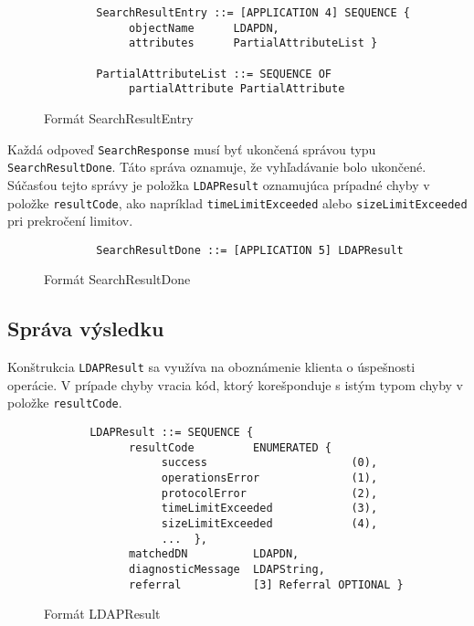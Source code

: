 \documentclass[11pt,a4paper]{article}
\begin{document}
\begin{figure}[H]
\begin{verbatim}
        SearchResultEntry ::= [APPLICATION 4] SEQUENCE {
             objectName      LDAPDN,
             attributes      PartialAttributeList }
             
        PartialAttributeList ::= SEQUENCE OF
             partialAttribute PartialAttribute
\end{verbatim}
\caption{Formát SearchResultEntry}
\end{figure}

\noindent Každá odpoveď \texttt{SearchResponse} musí byť ukončená správou typu \texttt{SearchResultDone}. Táto správa oznamuje, že vyhľadávanie bolo ukončené. Súčasťou tejto správy je položka \texttt{LDAPResult} oznamujúca prípadné chyby v položke \texttt{resultCode}, ako napríklad \texttt{timeLimitExceeded} alebo \texttt{sizeLimitExceeded} pri prekročení limitov. \\

\begin{figure}[H]
\begin{verbatim}
        SearchResultDone ::= [APPLICATION 5] LDAPResult
\end{verbatim}
\caption{Formát SearchResultDone}
\end{figure}

\subsection{Správa výsledku}
Konštrukcia \texttt{LDAPResult} sa využíva na oboznámenie klienta o úspešnosti operácie. V prípade chyby vracia kód, ktorý korešponduje s istým typom chyby v položke \texttt{resultCode}.\\

\begin{figure}[H]
\begin{verbatim}
       LDAPResult ::= SEQUENCE {
             resultCode         ENUMERATED {
                  success                      (0),
                  operationsError              (1),
                  protocolError                (2),
                  timeLimitExceeded            (3),
                  sizeLimitExceeded            (4),
                  ...  },
             matchedDN          LDAPDN,
             diagnosticMessage  LDAPString,
             referral           [3] Referral OPTIONAL }
\end{verbatim}
\caption{Formát LDAPResult}
\end{figure}
\end{document}

